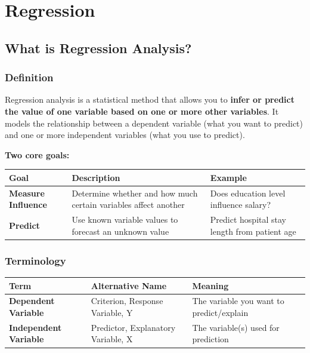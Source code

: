 \documentclass[12pt,openany]{book}
\begin{document}
\section{Regression}

\subsection{What is Regression Analysis?}


\subsubsection{Definition}


Regression analysis is a statistical method that allows you to \textbf{infer or predict the value of one variable based on one or more other variables}. It models the relationship between a dependent variable (what you want to predict) and one or more independent variables (what you use to predict).

\textbf{Two core goals:}

\begin{center}
\small
\renewcommand{\arraystretch}{1.15}
\begin{tabular}{|L{0.22\textwidth}|L{0.30\textwidth}|L{0.36\textwidth}|}
\hline
    Goal & Description & Example \\
\hline
    \textbf{Measure Influence} & Determine whether and how much certain variables affect another & Does education level influence salary? \\
\hline
    \textbf{Predict} & Use known variable values to forecast an unknown value & Predict hospital stay length from patient age \\
\hline
\end{tabular}
\end{center}
\normalsize


\subsubsection{Terminology}


\begin{center}
\small
\renewcommand{\arraystretch}{1.15}
\begin{tabular}{|L{0.22\textwidth}|L{0.30\textwidth}|L{0.36\textwidth}|}
\hline
    Term & Alternative Name & Meaning \\
\hline
    \textbf{Dependent Variable} & Criterion, Response Variable, Y & The variable you want to predict/explain \\
\hline
    \textbf{Independent Variable} & Predictor, Explanatory Variable, X & The variable(s) used for prediction \\
\hline
\end{tabular}
\end{center}
\normalsize
\end{document}
